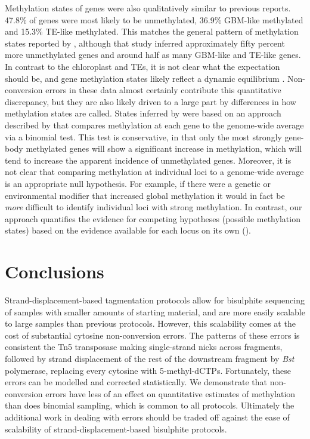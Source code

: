 \documentclass[12pt,longbibliography]{article}
\begin{document}
Methylation states of genes were also qualitatively similar to previous reports.
47.8\% of genes were most likely to be unmethylated, 36.9\% GBM-like methylated and 15.3\% TE-like methylated.
This matches the general pattern of methylation states reported by \textcite{zhang2020natural}, although that study inferred approximately fifty percent more unmethylated genes and around half as many GBM-like and TE-like genes.
In contrast to the chloroplast and TEs, it is not clear what the expectation should be, and gene methylation states likely reflect a dynamic equilibrium \parencite{zhang2020natural}.
Non-conversion errors in these data almost certainly contribute this quantitative discrepancy, but they are also likely driven to a large part by differences in how methylation states are called.
States inferred by \textcite{zhang2020natural} were based on an approach described by \textcite{takuno2012body} that compares methylation at each gene to the genome-wide average via a binomial test.
This test is conservative, in that only the most strongly gene-body methylated genes will show a significant increase in methylation, which will tend to increase the apparent incidence of unmethylated genes.
Moreover, it is not clear that comparing methylation at individual loci to a genome-wide average is an appropriate null hypothesis.
For example, if there were a genetic or environmental modifier that increased global methylation it would in fact be \textit{more} difficult to identify individual loci with strong methylation.
In contrast, our approach quantifies the evidence for competing hypotheses (possible methylation states) based on the evidence available for each locus on its own (\cite{chamberlin1890method, burnham2004multimodel}).

\section{Conclusions}

Strand-displacement-based tagmentation protocols allow for bisulphite sequencing of samples with smaller amounts of starting material, and are more easily scalable to large samples than previous protocols.
However, this scalability comes at the cost of substantial cytosine non-conversion errors.
The patterns of these errors is consistent the Tn5 transposase making single-strand nicks across fragments, followed by strand displacement of the rest of the downstream fragment by \textit{Bst} polymerase, replacing every cytosine with 5-methyl-dCTPs.
Fortunately, these errors can be modelled and corrected statistically.
We demonstrate that non-conversion errors have less of an effect on quantitative estimates of methylation than does binomial sampling, which is common to all protocols.
Ultimately the additional work in dealing with errors should be traded off against the ease of scalability of strand-displacement-based bisulphite protocols.
\end{document}
